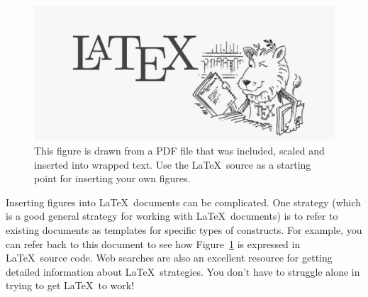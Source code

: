 \documentclass{IEEEtran}
\begin{document}
\begin{figure}

\centering
\includegraphics[frame, scale=0.1]{LaTeX_Lion.pdf}
\caption{\footnotesize This figure is drawn from a PDF file that 
was included, scaled and inserted into wrapped text.  Use the \LaTeX\ 
source as a starting point for inserting your own figures.}
\label{fig1}

\end{figure}
Inserting figures into \LaTeX\ documents can be complicated.  One strategy (which is a good general strategy for working with \LaTeX\ documents) is to refer to existing documents as templates for specific types of constructs.  For example, you can refer back to this document to see how Figure~\ref{fig1} is expressed in \LaTeX\ source code. Web searches are also an excellent resource for getting detailed information about \LaTeX\ strategies.  You don't have to struggle alone in trying to get \LaTeX\ to work!
\end{document}
